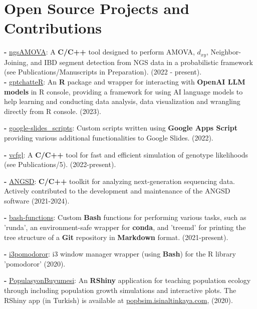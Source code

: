 \documentclass[letterpaper,10.5pt]{article}
\begin{document}
\section{Open Source Projects and Contributions}
\textbf{-}   \href{https://github.com/isinaltinkaya/ngsAMOVA}{ngsAMOVA}: A \textbf{C/C++} tool designed to perform AMOVA, $d_{xy}$, Neighbor-Joining, and IBD segment detection from NGS data in a probabilistic framework (see Publications/Manuscripts in Preparation). (2022 - present).  \\
\smallskip
\textbf{-}  \href{https://github.com/isinaltinkaya/gptchatteR}{gptchatteR}: An \textbf{R} package and wrapper for interacting with \textbf{OpenAI LLM models} in R console, providing a framework for using AI language models to help learning and conducting data analysis, data visualization and wrangling directly from R console. (2023). \\
\smallskip

\textbf{-}  \href{https://github.com/isinaltinkaya/google-slides_scripts}{google-slides\_scripts}: Custom scripts written using \textbf{Google Apps Script} providing various additional functionalities to Google Slides. (2022). \\
\smallskip

\textbf{-}  \href{https://github.com/isinaltinkaya/vcfgl}{vcfgl}: A \textbf{C/C++} tool for fast and efficient simulation of genotype likelihoods (see Publications/5). (2022-present). \\
\smallskip

\textbf{-}  \href{https://github.com/ANGSD/angsd}{ANGSD}: \textbf{C/C++} toolkit for analyzing next-generation sequencing data. Actively contributed to the development and maintenance of the ANGSD software (2021-2024).\\
\smallskip

\textbf{-}  \href{https://github.com/isinaltinkaya/bash-functions}{bash-functions}: Custom \textbf{Bash} functions for performing various tasks, such as 'runda', an environment-safe wrapper for \textbf{conda}, and 'treemd' for printing the tree structure of a \textbf{Git} repository in \textbf{Markdown} format. (2021-present).
\smallskip

\textbf{-}  \href{https://github.com/isinaltinkaya/i3pomodoror}{i3pomodoror}: i3 window manager wrapper (using \textbf{Bash}) for the R library 'pomodoror' (2020). \\
\smallskip

\textbf{-}  \href{https://github.com/isinaltinkaya/PopulasyonBuyumesi}{PopulasyonBuyumesi}: An \textbf{RShiny} application for teaching population ecology through including population growth simulations and interactive plots. The RShiny app (in Turkish) is available at \href{popbsim.isinaltinkaya.com/}{popbsim.isinaltinkaya.com}, (2020).\\
\smallskip
\end{document}

